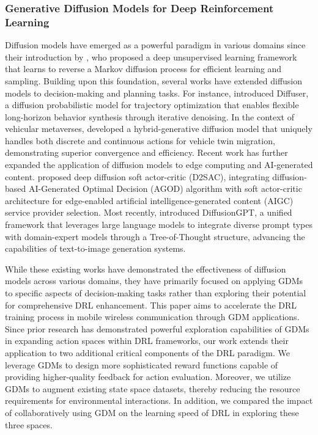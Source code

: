 \subsubsection{Generative Diffusion Models for Deep Reinforcement Learning}
Diffusion models have emerged as a powerful paradigm in various domains since their introduction by \cite{sohl2015deep}, who proposed a deep unsupervised learning framework that learns to reverse a Markov diffusion process for efficient learning and sampling. Building upon this foundation, several works have extended diffusion models to decision-making and planning tasks. For instance, \cite{janner2022planning} introduced Diffuser, a diffusion probabilistic model for trajectory optimization that enables flexible long-horizon behavior synthesis through iterative denoising. In the context of vehicular metaverses, \cite{kang2024hybrid} developed a hybrid-generative diffusion model that uniquely handles both discrete and continuous actions for vehicle twin migration, demonstrating superior convergence and efficiency. Recent work has further expanded the application of diffusion models to edge computing and AI-generated content. \cite{du2024diffusion} proposed deep diffusion soft actor-critic (D2SAC), integrating diffusion-based AI-Generated Optimal Decision (AGOD) algorithm with soft actor-critic architecture for edge-enabled artificial intelligence-generated content (AIGC) service provider selection. Most recently, \cite{qin2024diffusiongpt} introduced DiffusionGPT, a unified framework that leverages large language models to integrate diverse prompt types with domain-expert models through a Tree-of-Thought structure, advancing the capabilities of text-to-image generation systems. 



While these existing works have demonstrated the effectiveness of diffusion models across various domains, they have primarily focused on applying GDMs to specific aspects of decision-making tasks rather than exploring their potential for comprehensive DRL enhancement. This paper aims to accelerate the DRL training process in mobile wireless communication through GDM applications. Since prior research has demonstrated powerful exploration capabilities of GDMs in expanding action spaces within DRL frameworks, our work extends their application to two additional critical components of the DRL paradigm. We leverage GDMs to design more sophisticated reward functions capable of providing higher-quality feedback for action evaluation. Moreover, we utilize GDMs to augment existing state space datasets, thereby reducing the resource requirements for environmental interactions. In addition, we compared the impact of collaboratively using GDM on the learning speed of DRL in exploring these three spaces.






